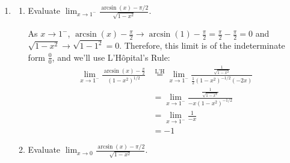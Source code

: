 \documentclass{article}
\begin{document}
\begin{enumerate}
\begin{enumerate}
\begin{solution}

      Although we can't find this value of $T$ exactly, it looks like it
      happens at about $T \approx  \boxed{1.6}$.
    \end{solution}

  \end{enumerate}

\item 
  \label{spring2008-midterm2-4-expanded}



  \begin{enumerate}
  \item 
    \begin{problem}[\vfill]
      Evaluate $\displaystyle \lim_{x\rightarrow 1^-}\frac{\arcsin (x)
        -\pi/2}{\sqrt{1-x^2}}.$
    \end{problem}

    \begin{solution}
      As $x \to 1^-$, $\arcsin(x) - \frac{\pi}{2} \to \arcsin (1) -
      \frac{\pi}{2} = \frac{\pi}{2} - \frac{\pi}{2} = 0$ and $\sqrt{1 -
        x^2} \to \sqrt{1 - 1^2} = 0$.  Therefore, this limit is of the
      indeterminate form $\frac{0}{0}$, and we'll use L'H\^opital's Rule: 
      \begin{align*}
        \lim_{x \to 1^-} \frac{\arcsin (x) - \frac{\pi}{2}}{(1 -
          x^2)^{1/2}} & \stackrel{\text{L'H}}{=} \lim_{x \to 1^-}
        \frac{\frac{1}{\sqrt{1
              - x^2}}}{ \frac{1}{2} (1 - x^2)^{-1/2} (-2x)} \\
        &= \lim_{x \to 1^-} \frac{\frac{1}{\sqrt{1
              - x^2}}}{ -x (1 - x^2)^{-1/2}} \\
        &= \lim_{x \to 1^-} \frac{1}{-x} \\
        &= \boxed{-1}
      \end{align*}
    \end{solution}

  \item
    \begin{problem}[\vfill]
      Evaluate $\displaystyle \lim_{x\rightarrow 0}\frac{\arcsin (x)
        -\pi/2}{\sqrt{1-x^2}}.$
    \end{problem}


\end{enumerate}
\end{enumerate}
\end{document}
